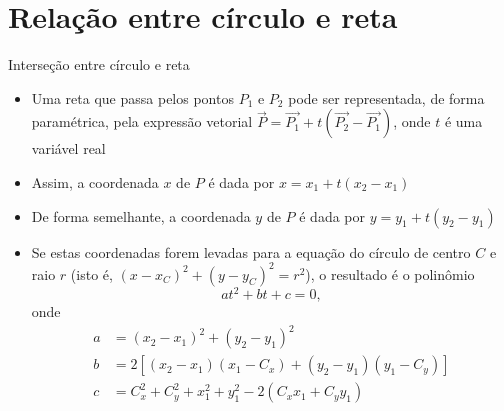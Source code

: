 \section{Relação entre círculo e reta}

\begin{frame}[fragile]{Interseção entre círculo e reta}

    \begin{itemize}
        \item Uma reta que passa pelos pontos $P_1$ e $P_2$ pode ser representada, de forma 
            paramétrica, pela expressão vetorial $\vec{P} = \vec{P_1} + t(\vec{P_2} - \vec{P_1})$, 
            onde $t$ é uma variável real
        \pause

        \item Assim, a coordenada $x$ de $P$ é dada por $x = x_1 + t(x_2 - x_1)$
        \pause

        \item De forma semelhante, a coordenada $y$ de $P$ é dada por $y = y_1 + t(y_2 - y_1)$
        \pause

        \item Se estas coordenadas forem levadas para a equação do círculo de centro $C$ e raio $r$
         (isto é, $(x - x_C)^2 + (y - y_C)^2 = r^2$), o resultado é o polinômio 
        \[
            at^2 + bt + c = 0,
        \]
        onde
        \begin{align*}
            a &= (x_2 - x_1)^2 + (y_2 - y_1)^2 \\
            b &= 2\left[(x_2 - x_1)(x_1 - C_x) + (y_2 - y_1)(y_1 - C_y)\right] \\
            c &= C_x^2 + C_y^2 + x_1^2 + y_1^2 - 2(C_xx_1 + C_yy_1)
        \end{align*}

    \end{itemize}

\end{frame}

